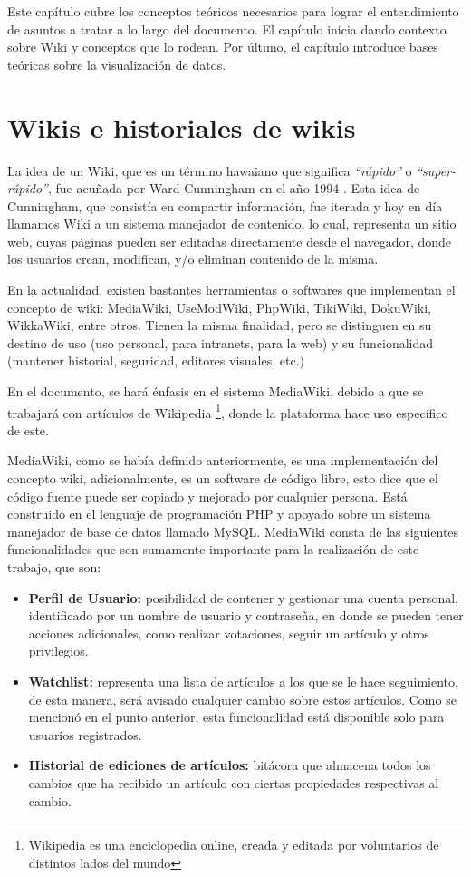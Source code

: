 Este capítulo cubre los conceptos teóricos necesarios para lograr el entendimiento de asuntos a tratar a lo largo del documento. El capítulo inicia dando contexto sobre Wiki y conceptos que lo rodean. Por último, el capítulo introduce bases teóricas sobre la visualización de datos.

\section{Wikis e historiales de wikis}
La idea de un Wiki, que es un término hawaiano que significa \textit{“rápido”} o \textit{“super-rápido”}, fue acuñada por Ward Cunningham en el año 1994 \cite{Wiki}.
Esta idea de Cunningham, que consistía en compartir información, fue iterada y hoy en día llamamos Wiki a un sistema manejador de contenido, lo cual, representa un sitio web, cuyas páginas pueden ser editadas directamente desde el navegador, donde los usuarios crean, modifican, y/o eliminan contenido de la misma.

En la actualidad, existen bastantes herramientas o softwares que implementan el concepto de wiki: MediaWiki, UseModWiki, PhpWiki, TikiWiki, DokuWiki, WikkaWiki, entre otros. Tienen la misma finalidad, pero se distinguen en su destino de uso (uso personal, para intranets, para la web) y su funcionalidad (mantener historial, seguridad, editores visuales, etc.)

En el documento, se hará énfasis en el sistema MediaWiki, debido a que se trabajará con artículos de Wikipedia \footnote{Wikipedia es una enciclopedia online, creada y editada por voluntarios de distintos lados del mundo}, donde la plataforma hace uso específico de este.

MediaWiki, como se había definido anteriormente, es una implementación del concepto wiki, adicionalmente, es un software de código libre, esto dice que el código fuente puede ser copiado y mejorado por cualquier persona. Está construido en el lenguaje de programación PHP y apoyado sobre un sistema manejador de base de datos llamado MySQL. MediaWiki consta de las siguientes funcionalidades que son sumamente importante para la realización de este trabajo, que son:

\begin{itemize}
    \item\textbf{Perfil de Usuario:} posibilidad de contener y gestionar una cuenta personal, identificado por un nombre de usuario y contraseña, en donde se pueden tener acciones adicionales, como realizar votaciones, seguir un artículo y otros privilegios.
    
    \item\textbf{Watchlist:} representa una lista de artículos a los que se le hace seguimiento, de esta manera, será avisado cualquier cambio sobre estos artículos. Como se mencionó en el punto anterior, esta funcionalidad está disponible solo para usuarios registrados.
    
    \item\textbf{Historial de ediciones de artículos:} bitácora que almacena todos los cambios que ha recibido un artículo con ciertas propiedades respectivas al cambio.
\end{itemize}

